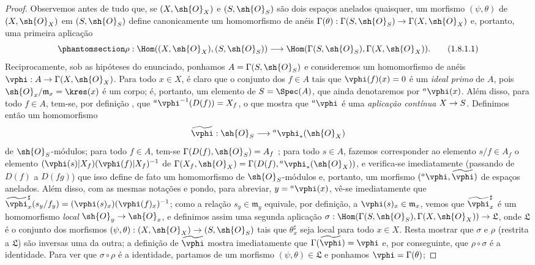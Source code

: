 \documentclass[oneside]{amsart}
\makeatletter
\newcommand{\ega@arrow}[2]{\mathchoice{#1}{#2}{#2}{#2}}
\renewcommand{\to}{\ega@arrow{\longrightarrow}{\rightarrow}}
\let\EGAOriginalLabel\label
\renewcommand{\label}[1]{\phantomsection\EGAOriginalLabel{#1}}
\makeatother
\begin{document}
\begin{proof}
Observemos antes de tudo que, se $(X,\sh{O}_X)$ e $(S,\sh{O}_S)$ são
dois espaços anelados quaisquer, um morfismo $(\psi,\theta)$ de
$(X,\sh{O}_X)$ em $(S,\sh{O}_S)$ define canonicamente um homomorfismo de
anéis
$\Gamma(\theta):\Gamma(S,\sh{O}_S)\to\Gamma(X,\sh{O}_X)$ e, portanto,
uma primeira aplicação
\[
  \label{I.1.8.1.1}
  \rho:\Hom((X,\sh{O}_X),(S,\sh{O}_S))\to\Hom(\Gamma(S,\sh{O}_S),\Gamma(X,\sh{O}_X)).
  \tag{1.8.1.1}
\]
Reciprocamente, sob as hipóteses do enunciado, ponhamos
$A=\Gamma(S,\sh{O}_S)$ e consideremos um homomorfismo de anéis
$\vphi:A\to\Gamma(X,\sh{O}_X)$.
Para todo $x\in X$, é claro que o conjunto dos $f\in A$ tais que
$\vphi(f)(x)=0$ é um \emph{ideal primo} de $A$, pois
$\sh{O}_x/\mathfrak{m}_x=\kres(x)$ é um corpo;
é, portanto, um elemento de $S=\Spec(A)$, que ainda denotaremos por
${}^a\vphi(x)$.
Além disso, para todo $f\in A$, tem-se, por definição
, que ${}^a\vphi^{-1}(D(f))=X_f$, o que mostra que
${}^a\vphi$ é uma \emph{aplicação contínua} $X\to S$.
Definimos então um homomorfismo
\[
  \widetilde{\vphi}:\sh{O}_S\to{}^a\vphi_*(\sh{O}_X)
\]
de $\sh{O}_S$-módulos;
para todo $f\in A$, tem-se $\Gamma(D(f),\sh{O}_S)=A_f$
;
para todo $s\in A$, fazemos corresponder ao elemento $s/f\in A_f$ o
elemento $(\vphi(s)|X_f)(\vphi(f)|X_f)^{-1}$ de
$\Gamma(X_f,\sh{O}_X)=\Gamma(D(f),{}^a\vphi_*(\sh{O}_X))$, e verifica-se
imediatamente (passando de $D(f)$ a $D(fg)$) que isso define de fato um
homomorfismo de $\sh{O}_S$-módulos e, portanto, um morfismo
$({}^a\vphi,\widetilde{\vphi})$ de espaços anelados.
Além disso, com as mesmas notações e pondo, para abreviar,
$y={}^a\vphi(x)$, vê-se imediatamente  que
$\widetilde{\vphi}_x^\sharp(s_y/f_y)=(\vphi(s)_x)(\vphi(f)_x)^{-1}$;
como a relação $s_y\in\mathfrak{m}_y$ equivale, por definição, a
$\vphi(s)_x\in\mathfrak{m}_x$, vemos que $\widetilde{\vphi}_x^\sharp$ é
um homomorfismo \emph{local} $\sh{O}_y\to\sh{O}_x$, e definimos assim uma
segunda aplicação
$\sigma:\Hom(\Gamma(S,\sh{O}_S),\Gamma(X,\sh{O}_X))\to\mathfrak{L}$,
onde $\mathfrak{L}$ é o conjunto dos morfismos
$(\psi,\theta):(X,\sh{O}_X)\to(S,\sh{O}_S)$ tais que
$\theta_x^\sharp$ seja local para todo $x\in X$.
Resta mostrar que $\sigma$ e $\rho$ (restrita a $\mathfrak{L}$) são
inversas uma da outra;
a definição de $\widetilde{\vphi}$ mostra imediatamente que
$\Gamma(\widetilde{\vphi})=\vphi$ e, por conseguinte, que
$\rho\circ\sigma$ é a identidade.
Para ver que $\sigma\circ\rho$ é a identidade, partamos de um morfismo
$(\psi,\theta)\in\mathfrak{L}$ e ponhamos $\vphi=\Gamma(\theta)$;

\end{proof}
\end{document}
